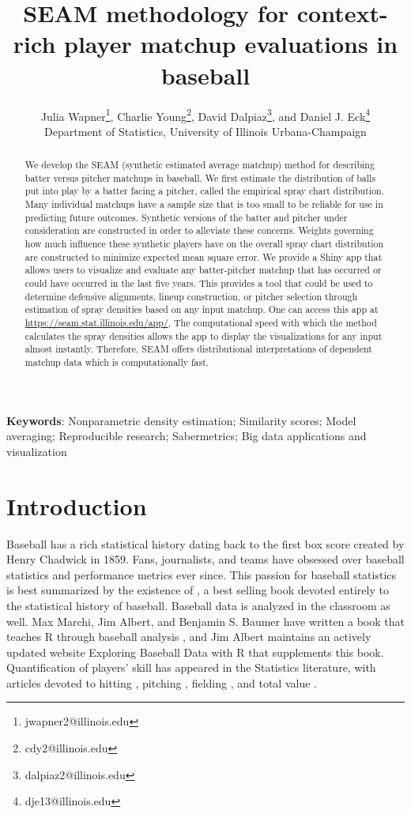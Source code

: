 \documentclass[12pt]{article}
\title{SEAM methodology for context-rich player matchup evaluations in baseball}
\author{Julia Wapner\thanks{jwapner2@illinois.edu}, 
Charlie Young\thanks{cdy2@illinois.edu}, 
David Dalpiaz\thanks{dalpiaz2@illinois.edu},
and Daniel J. Eck\thanks{dje13@illinois.edu} \\[1em]
Department of Statistics, University of Illinois Urbana-Champaign
}
\date{}
\begin{document}
\maketitle

\begin{abstract}
We develop the SEAM (synthetic estimated average matchup) method for describing batter versus pitcher matchups in baseball. We first estimate the distribution of balls put into play by a batter facing a pitcher, called the empirical spray chart distribution. Many individual matchups have a sample size that is too small to be reliable for use in predicting future outcomes. Synthetic versions of the batter and pitcher under consideration are constructed in order to alleviate these concerns. Weights governing how much influence these synthetic players have on the overall spray chart distribution are constructed to minimize expected mean square error. We provide a Shiny app that allows users to visualize and evaluate any batter-pitcher matchup that has occurred or could have occurred in the last five years. This provides a tool that could be used to determine defensive alignments, lineup construction, or pitcher selection through estimation of spray densities based on any input matchup. One can access this app at \url{https://seam.stat.illinois.edu/app/}. The computational speed with which the method calculates the spray densities allows the app to display the visualizations for any input almost instantly. Therefore, SEAM offers distributional interpretations of dependent matchup data which is computationally fast.
\end{abstract}

\noindent\textbf{Keywords}: Nonparametric density estimation; Similarity scores; Model averaging; Reproducible research; Sabermetrics; Big data applications and visualization


\section{Introduction}

Baseball has a rich statistical history dating back to the first box score created by Henry Chadwick in 1859. Fans, journalists, and teams have obsessed over baseball statistics and performance metrics ever since. This passion for baseball statistics is best summarized by the existence of \cite{schwarz2004numbers}, a best selling book devoted entirely to the statistical history of baseball. Baseball data is analyzed in the classroom as well. Max Marchi, Jim Albert, and Benjamin S. Baumer have written a book that teaches R through baseball analysis \citep{marchi2019analyzing}, and Jim Albert maintains an actively updated website Exploring Baseball Data with R that supplements this book.
Quantification of players' skill has appeared in the Statistics literature, with articles devoted to
hitting \citep{berry1999bridging, albert2008streaky, brown2008season, jensen2009hierarchical},
pitching \citep{albert2006pitching, shinya2017pitching},
fielding \citep{jensen2009bayesball, piette2012estimating},
and total value \citep{baumer2015openwar}.
\end{document}
